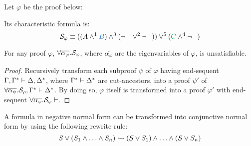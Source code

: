 \documentclass{llncs}
\begin{document}
\begin{example}
\label{example:CutPertinentStruct}

Let $\varphi$ be the proof below:
\begin{prooftree}
		 
	 
						 
					 
					 
									 
								 
\end{prooftree}

\noindent
Its characteristic formula is:
$$
\cutpertstruct{\varphi} 
\equiv 
((\hA{A} \structplus^1 \hB{B}) \structplus^3 (\structdual{\hC{B}} \structtimes^2 \structdual{\hD{A}}))
\structtimes^5
(\hE{C} \structplus^4 \structdual{\hF{C}})
$$

\end{example}

\begin{theorem}
For any proof $\varphi$, $\all \overline{\alpha_{\varphi}}. \cutpertstruct{\varphi}$, where $\overline{\alpha_{\varphi}}$ are the eigenvariables of $\varphi$, is unsatisfiable. 
\end{theorem}
\begin{proof}
Recursively transform each subproof $\psi$ of $\varphi$ having end-sequent $\Gamma, \Gamma^* \seq \Delta, \Delta^*$, where $\Gamma^* \seq \Delta^*$ are cut-ancestors, into a proof $\psi'$ of $\all \overline{\alpha_{\psi}}. \cutpertstruct{\rho}, \Gamma^* \seq \Delta^*$. By doing so, $\varphi$ itself is transformed into a proof $\varphi'$ with end-sequent $\all \overline{\alpha_{\varphi}}. \cutpertstruct{\varphi} \seq$.
\end{proof}






\begin{definition}
\label{definition:NormalizationPlusTimes}
A formula in negative normal form can be transformed into conjunctive normal form by using the following rewrite rule:
$$
S \structtimes (S_1 \structplus \ldots \structplus S_n)   \normalizePlusTimes  (S \structtimes S_1) \structplus \ldots \structplus (S \structtimes S_n) 
$$
\end{definition}
\end{document}
